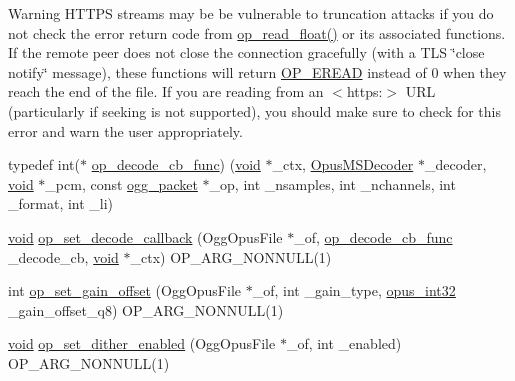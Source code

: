 \begin{DoxyWarning}{Warning}
H\+T\+T\+PS streams may be be vulnerable to truncation attacks if you do not check the error return code from \mbox{\hyperlink{group__stream__decoding_ga73493002d84a234f5e19b70f1dddbe2a}{op\+\_\+read\+\_\+float()}} or its associated functions. If the remote peer does not close the connection gracefully (with a T\+LS \char`\"{}close notify\char`\"{} message), these functions will return \mbox{\hyperlink{group__error__codes_ga3ad48a4f99b1bed72acec552296dfc08}{O\+P\+\_\+\+E\+R\+E\+AD}} instead of 0 when they reach the end of the file. If you are reading from an $<$https\+:$>$ U\+RL (particularly if seeking is not supported), you should make sure to check for this error and warn the user appropriately. 
\end{DoxyWarning}
\begin{DoxyCompactItemize}
\item 
typedef int($\ast$ \mbox{\hyperlink{group__stream__decoding_ga81a50874a82484034c22dfeddce177e1}{op\+\_\+decode\+\_\+cb\+\_\+func}}) (\mbox{\hyperlink{_s_d_l__opengles2__gl2ext_8h_ae5d8fa23ad07c48bb609509eae494c95}{void}} $\ast$\+\_\+ctx, \mbox{\hyperlink{group__opus__multistream_gad3497495deb9a8ace82e76cd4f93e0e4}{Opus\+M\+S\+Decoder}} $\ast$\+\_\+decoder, \mbox{\hyperlink{_s_d_l__opengles2__gl2ext_8h_ae5d8fa23ad07c48bb609509eae494c95}{void}} $\ast$\+\_\+pcm, const \mbox{\hyperlink{structogg__packet}{ogg\+\_\+packet}} $\ast$\+\_\+op, int \+\_\+nsamples, int \+\_\+nchannels, int \+\_\+format, int \+\_\+li)
\item 
\mbox{\hyperlink{_s_d_l__opengles2__gl2ext_8h_ae5d8fa23ad07c48bb609509eae494c95}{void}} \mbox{\hyperlink{group__stream__decoding_gae0d5b986dff23a82b6002915268ee3d1}{op\+\_\+set\+\_\+decode\+\_\+callback}} (Ogg\+Opus\+File $\ast$\+\_\+of, \mbox{\hyperlink{group__stream__decoding_ga81a50874a82484034c22dfeddce177e1}{op\+\_\+decode\+\_\+cb\+\_\+func}} \+\_\+decode\+\_\+cb, \mbox{\hyperlink{_s_d_l__opengles2__gl2ext_8h_ae5d8fa23ad07c48bb609509eae494c95}{void}} $\ast$\+\_\+ctx) O\+P\+\_\+\+A\+R\+G\+\_\+\+N\+O\+N\+N\+U\+LL(1)
\item 
int \mbox{\hyperlink{group__stream__decoding_ga7df927613ccf57996319678e08513289}{op\+\_\+set\+\_\+gain\+\_\+offset}} (Ogg\+Opus\+File $\ast$\+\_\+of, int \+\_\+gain\+\_\+type, \mbox{\hyperlink{opus__types_8h_aa4d309d6f80b99dbabebc8f98879ab9a}{opus\+\_\+int32}} \+\_\+gain\+\_\+offset\+\_\+q8) O\+P\+\_\+\+A\+R\+G\+\_\+\+N\+O\+N\+N\+U\+LL(1)
\item 
\mbox{\hyperlink{_s_d_l__opengles2__gl2ext_8h_ae5d8fa23ad07c48bb609509eae494c95}{void}} \mbox{\hyperlink{group__stream__decoding_gac1de9480ad0fa65de778d9c88f62f6f3}{op\+\_\+set\+\_\+dither\+\_\+enabled}} (Ogg\+Opus\+File $\ast$\+\_\+of, int \+\_\+enabled) O\+P\+\_\+\+A\+R\+G\+\_\+\+N\+O\+N\+N\+U\+LL(1)

\end{DoxyCompactItemize}
